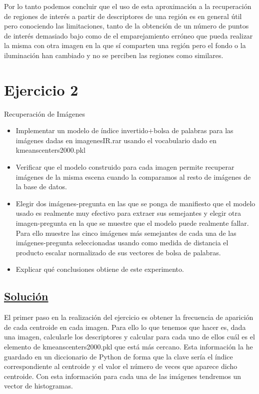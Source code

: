 \documentclass[12pt,a4paper]{article}
\begin{document}
\vspace{10px}

Por lo tanto podemos concluir que el uso de esta aproximación a la recuperación de regiones de interés a partir de descriptores de una región es en general útil pero conociendo las limitaciones, tanto de la obtención de un número de puntos de interés demasiado bajo como de el emparejamiento erróneo que pueda realizar la misma con otra imagen en la que sí comparten una región pero el fondo o la iluminación han cambiado y no se perciben las regiones como similares.

\section{Ejercicio 2}
Recuperación de Imágenes
\begin{itemize}
  \item Implementar un modelo de índice invertido+bolsa de palabras para las imágenes dadas en imagenesIR.rar usando el vocabulario dado en kmeanscenters2000.pkl
  \item Verificar que el modelo construido para cada imagen permite recuperar imágenes de la misma escena cuando la comparamos al resto de imágenes de la base de datos.
  \item Elegir dos imágenes-pregunta en las que se ponga de manifiesto que el modelo usado es realmente muy efectivo para extraer sus semejantes y elegir otra imagen-pregunta en la que se muestre que el modelo puede realmente fallar. Para ello muestre las cinco imágenes más semejantes de cada una de las imágenes-pregunta seleccionadas usando como medida de distancia el producto escalar normalizado de sus vectores de bolsa de palabras.
  \item Explicar qué conclusiones obtiene de este experimento.
\end{itemize}

\subsection*{\underline{Solución}}

El primer paso en la realización del ejercicio es obtener la frecuencia de aparición de cada centroide en cada imagen. Para ello lo que tenemos que hacer es, dada una imagen, calcularle los descriptores y calcular para cada uno de ellos cuál es el elemento de kmeanscenters2000.pkl que está más cercano. Esta información la he guardado en un diccionario de Python de forma que la clave sería el índice correspondiente al centroide y el valor el número de veces que aparece dicho centroide. Con esta información para cada una de las imágenes tendremos un vector de histogramas.
\end{document}
